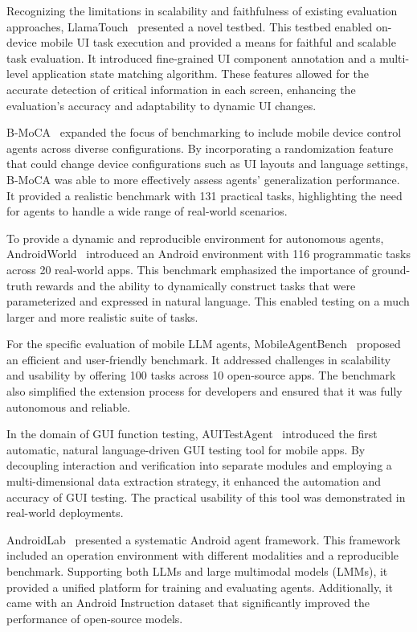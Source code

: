 Recognizing the limitations in scalability and faithfulness of existing evaluation approaches, LlamaTouch~\cite{zhang2024llamatouch} presented a novel testbed. This testbed enabled on-device mobile UI task execution and provided a means for faithful and scalable task evaluation. It introduced fine-grained UI component annotation and a multi-level application state matching algorithm. These features allowed for the accurate detection of critical information in each screen, enhancing the evaluation's accuracy and adaptability to dynamic UI changes.

B-MoCA~\cite{lee2024BMoCA} expanded the focus of benchmarking to include mobile device control agents across diverse configurations. By incorporating a randomization feature that could change device configurations such as UI layouts and language settings, B-MoCA was able to more effectively assess agents' generalization performance. It provided a realistic benchmark with 131 practical tasks, highlighting the need for agents to handle a wide range of real-world scenarios.

To provide a dynamic and reproducible environment for autonomous agents, AndroidWorld~\cite{rawles2024androidworld} introduced an Android environment with 116 programmatic tasks across 20 real-world apps. This benchmark emphasized the importance of ground-truth rewards and the ability to dynamically construct tasks that were parameterized and expressed in natural language. This enabled testing on a much larger and more realistic suite of tasks.

For the specific evaluation of mobile LLM agents, MobileAgentBench~\cite{wang2024mobileagentbench} proposed an efficient and user-friendly benchmark. It addressed challenges in scalability and usability by offering 100 tasks across 10 open-source apps. The benchmark also simplified the extension process for developers and ensured that it was fully autonomous and reliable.

In the domain of GUI function testing, AUITestAgent~\cite{hu2024auitestagent} introduced the first automatic, natural language-driven GUI testing tool for mobile apps. By decoupling interaction and verification into separate modules and employing a multi-dimensional data extraction strategy, it enhanced the automation and accuracy of GUI testing. The practical usability of this tool was demonstrated in real-world deployments.

AndroidLab~\cite{xu2024androidlab} presented a systematic Android agent framework. This framework included an operation environment with different modalities and a reproducible benchmark. Supporting both LLMs and large multimodal models (LMMs), it provided a unified platform for training and evaluating agents. Additionally, it came with an Android Instruction dataset that significantly improved the performance of open-source models.

